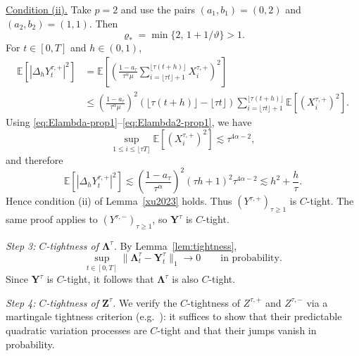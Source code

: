 \documentclass[letterpaper]{article}
\numberwithin{equation}{section}
\theoremstyle{definition}
\theoremstyle{remark}
\newcommand{\E}{\mathbb{E}}
\begin{document}
\smallskip
\noindent
\underline{Condition (ii).}
Take $p=2$ and use the pairs
$(a_1,b_1)=(0,2)$ and $(a_2,b_2)=(1,1)$.
Then
\[
  \varrho_*=\min\{2,\,1+1/\vartheta\}>1.
\]
For $t\in[0,T]$ and $h\in(0,1)$,
\begin{align*}
  \E\!\left[\left|\Delta_hY_t^{\tau,+}\right|^2\right]
  &=
  \E\!\left[
    \left(
      \frac{1-a_\tau}{\tau^\alpha\mu}
      \sum_{i=\lfloor \tau t\rfloor+1}^{\lfloor \tau(t+h)\rfloor}X_i^{\tau,+}
    \right)^2
  \right] \\
  &\le
  \left(\frac{1-a_\tau}{\tau^\alpha\mu}\right)^2
  \left(\lfloor \tau(t+h)\rfloor-\lfloor \tau t\rfloor\right)
  \sum_{i=\lfloor \tau t\rfloor+1}^{\lfloor \tau(t+h)\rfloor}
  \E\left[\left(X_i^{\tau,+}\right)^2\right].
\end{align*}
Using \eqref{eq:Elambda-prop1}--\eqref{eq:Elambda2-prop1}, we have
\[
  \sup_{1\le i\le \lfloor \tau T\rfloor}\E\left[\left(X_i^{\tau,+}\right)^2\right]
  \lesssim \tau^{4\alpha-2},
\]
and therefore
\[
  \E\!\left[\left|\Delta_hY_t^{\tau,+}\right|^2\right]
  \lesssim
  \left(\frac{1-a_\tau}{\tau^\alpha}\right)^2
  (\tau h+1)^2\tau^{4\alpha-2}
  \lesssim h^2+\frac{h}{\tau}.
\]
Hence condition (ii) of Lemma~\ref{xu2023} holds. Thus
$(Y^{\tau,+})_{\tau\ge1}$ is $C$-tight. The same proof applies to
$(Y^{\tau,-})_{\tau\ge1}$, so $\mathbf Y^\tau$ is $C$-tight.

\medskip
\noindent
\textit{Step 3: $C$-tightness of $\boldsymbol\Lambda^\tau$.}
By Lemma~\ref{lem:tightness},
\[
  \sup_{t\in[0,T]}\|\boldsymbol\Lambda_t^\tau-\mathbf Y_t^\tau\|_1\to0
  \qquad\text{in probability.}
\]
Since $\mathbf Y^\tau$ is $C$-tight, it follows that $\boldsymbol\Lambda^\tau$ is also
$C$-tight.

\medskip
\noindent
\textit{Step 4: $C$-tightness of $\mathbf Z^\tau$.}
We verify the $C$-tightness of $Z^{\tau,+}$ and $Z^{\tau,-}$ via a
martingale tightness criterion (e.g.\ \cite[Proposition~12]{rebolledo1980central}):
it suffices to show that their predictable quadratic variation processes are
$C$-tight and that their jumps vanish in probability.
\end{document}
